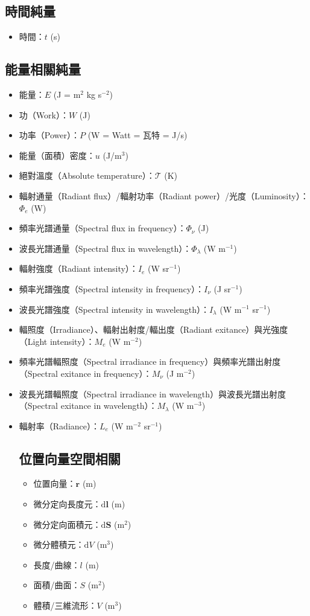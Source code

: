 \documentclass[a4paper,12pt]{report}
\begin{document}
\subsection{時間純量}
\begin{itemize}
\item 時間：$t$ (s)
\end{itemize}
\subsection{能量相關純量}
\begin{itemize}
\item 能量：$E$ (J = m$^2$ kg s$^{-2}$)
\item 功（Work）：$W$ (J)
\item 功率（Power）：$P$ (W = Watt = 瓦特 = J/s)
\item 能量（面積）密度：$u$ (J/m$^3$)
\item 絕對溫度（Absolute temperature）：$\mathscr{T}$ (K)
\item 輻射通量（Radiant flux）/輻射功率（Radiant power）/光度（Luminosity）：$\Phi_e$ (W)
\item 頻率光譜通量（Spectral flux in frequency）：$\Phi_{\nu}$ (J)
\item 波長光譜通量（Spectral flux in wavelength）：$\Phi_{\lambda}$ (W m$^{-1}$)
\item 輻射強度（Radiant intensity）：$I_e$ (W sr$^{-1}$)
\item 頻率光譜強度（Spectral intensity in frequency）：$I_{\nu}$ (J sr$^{-1}$)
\item 波長光譜強度（Spectral intensity in wavelength）：$I_{\lambda}$ (W m$^{-1}$ sr$^{-1}$)
\item 輻照度（Irradiance）、輻射出射度/輻出度（Radiant exitance）與光強度（Light intensity）：$M_e$ (W m$^{-2}$)
\item 頻率光譜輻照度（Spectral irradiance in frequency）與頻率光譜出射度（Spectral exitance in frequency）：$M_{\nu}$ (J m$^{-2}$)
\item 波長光譜輻照度（Spectral irradiance in wavelength）與波長光譜出射度（Spectral exitance in wavelength）：$M_{\lambda}$ (W m$^{-3}$)
\item 輻射率（Radiance）：$L_e$ (W m$^{-2}$ sr$^{-1}$)
\eit
\subsection{位置向量空間相關}
\begin{itemize}
\item 位置向量：$\mathbf{r}$ (m)
\item 微分定向長度元：$\mathrm{d}\mathbf{l}$ (m)
\item 微分定向面積元：$\mathrm{d}\mathbf{S}$ (m$^2$)
\item 微分體積元：$\mathrm{d}V$ (m$^3$)
\item 長度/曲線：$l$ (m)
\item 面積/曲面：$S$ (m$^2$)
\item 體積/三維流形：$V$ (m$^3$)
\end{itemize}

\end{itemize}
\end{document}
